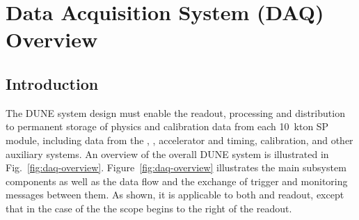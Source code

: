 \section{Data Acquisition System (DAQ) Overview}
\label{sec:fdsp-daq-ov}


\subsection{Introduction}
\label{sec:fdsp-daq-intro}

The DUNE    system
design must enable the readout, processing and distribution to
permanent storage of physics and calibration data from each 10~kton SP
module, including data from the , , accelerator and timing,
calibration, and other auxiliary systems.
An overview of the overall DUNE   system is illustrated in
Fig.~\ref{fig:daq-overview}. 
Figure~\ref{fig:daq-overview} illustrates the main  subsystem
components as well as the data flow and the exchange of trigger and
monitoring messages between them.
As shown, it is applicable to both  and  readout, except
that in the case of the  the  scope begins to the right of
the  readout. 


